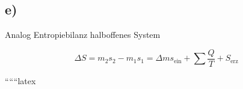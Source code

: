 

\subsection*{e)}
Analog Entropiebilanz halboffenes System

\[
\Delta S = m_2 s_2 - m_1 s_1 = \Delta m s_{\text{ein}} + \sum \frac{Q}{T} + S_{\text{erz}}
\]

``````latex